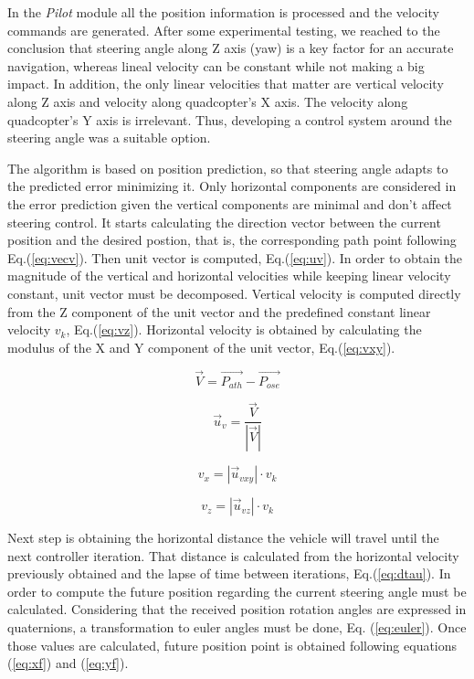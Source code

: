 \documentclass{styles/svproc}
\begin{document}
	In the \textit{Pilot} module all the position information is processed and the velocity commands are generated. 
After some experimental testing, we reached to the conclusion that steering angle along Z axis (yaw) is a key factor for an accurate navigation, whereas lineal velocity can be constant while not making a big impact. In addition, the only linear velocities that matter are vertical velocity along Z axis and velocity along quadcopter's X axis. The velocity along quadcopter's Y axis is irrelevant. Thus, developing a control system around the steering angle was a suitable option.

 The algorithm is based on position prediction, so that steering angle adapts to the predicted error minimizing it. Only horizontal components are considered in the error prediction given the vertical components are minimal and don't affect steering control. It starts calculating the direction vector between the current position and the desired postion, that is, the corresponding path point following Eq.(\ref{eq:vecv}). Then unit vector is computed, Eq.(\ref{eq:uv}). In order to obtain the magnitude of the vertical and horizontal velocities while keeping linear velocity constant, unit vector must be decomposed. Vertical velocity is computed directly from the Z component of the unit vector and the predefined constant linear velocity $v_{k}$, Eq.(\ref{eq:vz}). Horizontal velocity is obtained by calculating the modulus of the X and Y component of the unit vector, Eq.(\ref{eq:vxy}).

	\begin{equation}
	\vec{V} = \vec{P_{ath}} - \vec{P_{ose}}
	\label{eq:vecv}
	\end{equation}
	
	\begin{equation}
	\vec{u}_{v} = \frac{\vec{V}}{|\vec{V}|}
	\label{eq:uv}
	\end{equation}
	
	\begin{equation}
	v_{x} = |\vec{u}_{vxy}| \cdot v_{k}
	\label{eq:vxy}
	\end{equation}
	
	\begin{equation}
	v_{z} = |\vec{u}_{vz}| \cdot v_{k}
	\label{eq:vz}
	\end{equation}
	
	Next step is obtaining the horizontal distance the vehicle will travel until the next controller iteration. That distance is calculated from the horizontal velocity previously obtained and the lapse of time between iterations, Eq.(\ref{eq:dtau}). In order to compute the future position regarding the current steering angle must be calculated. Considering that the received position rotation angles are expressed in quaternions, a transformation to euler angles must be done, Eq. (\ref{eq:euler}). Once those values are calculated, future position point is obtained following equations (\ref{eq:xf}) and (\ref{eq:yf}).
	
\end{document}
